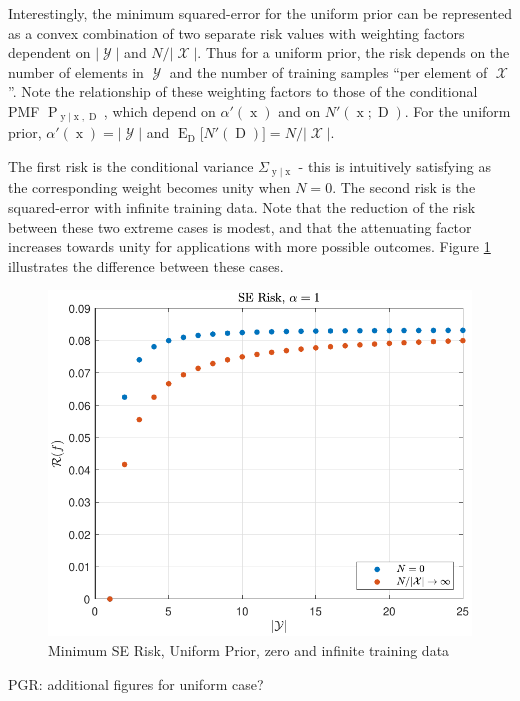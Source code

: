 \documentclass[12pt]{article}
\DeclareMathOperator{\xrm}{\mathrm{x}}
\DeclareMathOperator{\yrm}{\mathrm{y}}
\DeclareMathOperator{\Drm}{\mathrm{D}}
\DeclareMathOperator{\Prm}{\mathrm{P}}
\DeclareMathOperator{\Erm}{\mathrm{E}}
\DeclareMathOperator{\Xcal}{\mathcal{X}}
\DeclareMathOperator{\Ycal}{\mathcal{Y}}
\begin{document}
Interestingly, the minimum squared-error for the uniform prior can be represented as a convex combination of two separate risk values with weighting factors dependent on $|\Ycal|$ and $N/|\Xcal|$. Thus for a uniform prior, the risk depends on the number of elements in $\Ycal$ and the number of training samples ``per element of $\Xcal$''. Note the relationship of these weighting factors to those of the conditional PMF $\Prm_{\yrm | \xrm,\Drm}$, which depend on $\alpha'(\xrm)$ and on $N'(\xrm;\Drm)$. For the uniform prior, $\alpha'(\xrm) = |\Ycal|$ and $\Erm_{\Drm}\big[ N'(\Drm) \big] = N/|\Xcal|$.

The first risk is the conditional variance $\Sigma_{\yrm|\xrm}$ - this is intuitively satisfying as the corresponding weight becomes unity when $N=0$. The second risk is the squared-error with infinite training data. Note that the reduction of the risk between these two extreme cases is modest, and that the attenuating factor increases towards unity for applications with more possible outcomes. Figure \ref{fig:Risk_SE_uniform_N_lim} illustrates the difference between these cases.

\begin{figure}
\centering
\includegraphics[width=0.7\linewidth]{Risk_SE_uniform_N_lim.pdf}
\caption{Minimum SE Risk, Uniform Prior, zero and infinite training data}
\label{fig:Risk_SE_uniform_N_lim}
\end{figure}


PGR: additional figures for uniform case?

%
%
\end{document}
